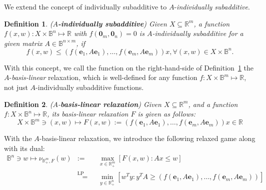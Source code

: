 \documentclass[11pt]{article}\usepackage[]{graphicx}\usepackage[]{xcolor}
\newtheorem{deff}{Definition}
\begin{document}
We extend the concept of individually subadditive to $A$-\emph{individually subadditive}.
\begin{deff}\label{def:matrix-subadditive} (\textbf{$A$-individually subadditive}) Given $X\subseteq \mathbb{R}^m$, a function $f(x, w): X\times \mathbb{B}^n\mapsto \mathbb{R}$ with $f(\mathbf{0}_m, \mathbf{0}_n)=0$ is $A$-individually subadditive for a given matrix $A\in\mathbb{B}^{n\times m}$, if 
\[
f(x,w)\le \left(f\left(\mathbf{e}_1, A\mathbf{e}_1\right),\dots, f\left(\mathbf{e}_m, A\mathbf{e}_m\right)\right)x, \forall (x,w)\in X\times \mathbb{B}^n.
\]
\end{deff}

With this concept, we call the function on the right-hand-side of Definition~\ref{def:matrix-subadditive} the $A$-\emph{basis-linear} relaxation, which is well-defined for any function $f: X\times \mathbb{B}^m \mapsto \mathbb{R}$, not just $A$-individually subadditive functions.
\begin{deff}\label{deff:basis-linear-relaxation} ($A$-\textbf{basis-linear relaxation}) Given $X\subseteq \mathbb{R}^m$, and a function $f: X\times \mathbb{B}^n\mapsto \mathbb{R}$, its basis-linear relaxation $F$ is given as follows:
\[
X\times \mathbb{B}^m\ni (x, w)\mapsto F(x,w):=\left(f\left(\mathbf{e}_1, A\mathbf{e}_1\right),\dots, f\left(\mathbf{e}_m, A\mathbf{e}_m\right)\right)x\in\mathbb{R}
\]
\end{deff}

With the $A$-basis-linear relaxation, we introduce the following relaxed game along with its dual:
\begin{eqnarray}
\label{eq:NLP-relax-primal-obj}
\mathbb{B}^n\ni w\mapsto \nu_{\mathbb{R}^m_{+}, F}(w)&:=&\max\limits_{x\in \mathbb{R}^m_{+}} \left[F(x,w): Ax\le w\right] \\
\label{eq:NLP-relax-dual-obj}&\overset{\text{LP duality}}{=}&\min\limits_{y\in \mathbb{R}^n_{+}} \left[w^Ty: y^TA\ge \left(f\left(\mathbf{e}_1, A\mathbf{e}_1\right),\dots, f\left(\mathbf{e}_m, A\mathbf{e}_m\right)\right)\right]
\end{eqnarray}
\end{document}
